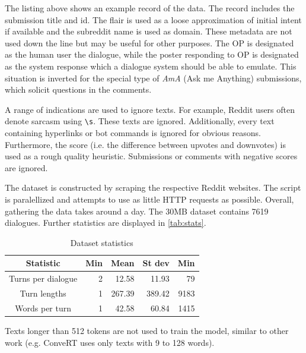 \documentclass{article}
\begin{document}
The listing above shows an example record of the data. The record includes the submission title and id. The flair is used as a loose approximation of initial intent if available and the subreddit name is used as domain. These metadata are not used down the line but may be useful for other purposes. The OP is designated as the human user the dialogue, while the poster responding to OP is designated as the system response which a dialogue system should be able to emulate. This situation is inverted for the special type of \textit{AmA} (Ask me Anything) submissions, which solicit questions in the comments.

A range of indications are used to ignore texts. For example, Reddit users often denote sarcasm using \texttt{\textbackslash s}. These texts are ignored. Additionally, every text containing hyperlinks or bot commands is ignored for obvious reasons. Furthermore, the score (i.e. the difference between upvotes and downvotes) is used as a rough quality heuristic. Submissions or comments with negative scores are ignored.

The dataset is constructed by scraping the respective Reddit websites. The script is paralellized and attempts to use as little HTTP requests as possible. Overall, gathering the data takes around a day. The 30MB dataset contains 7619 dialogues. Further statistics are displayed in \autoref{tab:stats}.

\begin{table}
\begin{tabular}{c r r r r}
Statistic & Min & Mean & St dev & Min \\
\hline
Turns per dialogue & 2 & 12.58 & 11.93 & 79 \\
Turn lengths & 1 & 267.39 & 389.42 & 9183 \\
Words per turn & 1 & 42.58 & 60.84 & 1415
\end{tabular}
\caption{Dataset statistics}
\label{tab:stats}
\end{table}

Texts longer than 512 tokens are not used to train the model, similar to other work (e.g. ConveRT uses only texts with 9 to 128 words).
\end{document}

